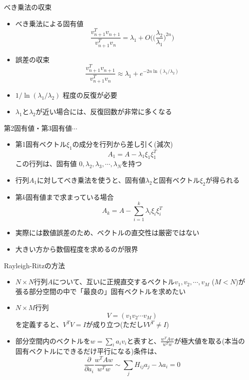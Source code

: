 \begin{frame}[t,fragile]{べき乗法の収束}
  \begin{itemize}
    \setlength{\itemsep}{1em}
  \item べき乗法による固有値
    \[
    \frac{v_{n+1}^T v_{n+1}}{v_{n+1}^T v_n} = \lambda_1 + O\Big( \big(\frac{\lambda_2}{\lambda_1} \big)^{2n}\Big)
    \]
  \item 誤差の収束
    \[
    \frac{v_{n+1}^T v_{n+1}}{v_{n+1}^T v_n} \approx \lambda_1 + e^{-2n \ln (\lambda_1/\lambda_2)}
    \]
  \item $1 / \ln (\lambda_1/\lambda_2)$ 程度の反復が必要
  \item $\lambda_1$と$\lambda_2$が近い場合には、反復回数が非常に多くなる
  \end{itemize}
\end{frame}

\begin{frame}[t,fragile]{第2固有値・第3固有値$\cdots$}
  \begin{itemize}
  \item 第1固有ベクトル$\xi_1$の成分を行列から差し引く(減次)
    \[
    A_1 = A - \lambda_1 \xi_1 \xi_1^T
    \]
    この行列は、固有値 $0,\lambda_2,\lambda_3,\cdots,\lambda_N$を持つ
  \item 行列$A_1$に対してべき乗法を使うと、固有値$\lambda_2$と固有ベクトル$\xi_2$が得られる
  \item 第$k$固有値まで求まっている場合
    \[
    A_k = A - \sum_{i=1}^k \lambda_i \xi_i \xi_i^T
    \]
  \item 実際には数値誤差のため、ベクトルの直交性は厳密ではない
  \item 大きい方から数個程度を求めるのが限界
  \end{itemize}
\end{frame}

\begin{frame}[t,fragile]{Rayleigh-Ritzの方法}
  \begin{itemize}
    \setlength{\itemsep}{1em}
  \item $N \times N$行列$A$について、互いに正規直交するベクトル$v_1,v_2,\cdots,v_M$ ($M < N$)が張る部分空間の中で「最良の」固有ベクトルを求めたい
  \item $N \times M$行列
    \[
    V=(v_1 v_2 \cdots v_M)
    \]
    を定義すると、$V^TV=I$が成り立つ(ただし$VV^T \ne I$)
  \item 部分空間内のベクトルを$w = \sum_i a_i v_i$と表すと、$\frac{w^TAw}{w^Tw}$が極大値を取る(本当の固有ベクトルにできるだけ平行になる)条件は、
    \[
    \frac{\partial}{\partial a_i} \frac{w^TAw}{w^Tw} \sim \sum_j H_{ij}a_j - \lambda a_i = 0
    \]
  \end{itemize}
\end{frame}

